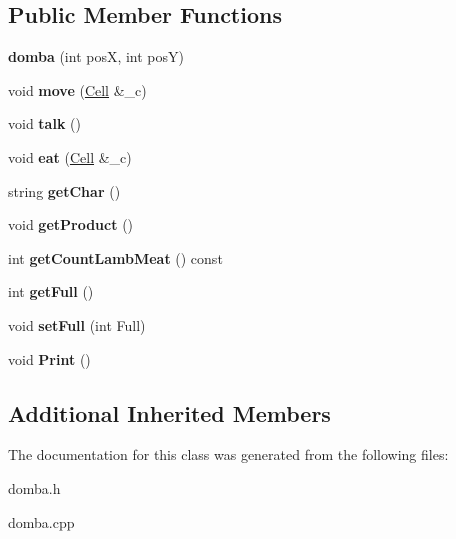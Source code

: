 \subsection*{Public Member Functions}
\begin{DoxyCompactItemize}
\item 
\mbox{\label{classdomba_a2b68f77b04b105d52ce1c3466d13c42a}} 
{\bfseries domba} (int posX, int posY)
\item 
\mbox{\label{classdomba_ab3afd792e6e1dc41d849ad891cf299e3}} 
void {\bfseries move} (\hyperlink{classCell}{Cell} \&\+\_\+c)
\item 
\mbox{\label{classdomba_afbed61a200b204818b134c8c76412d55}} 
void {\bfseries talk} ()
\item 
\mbox{\label{classdomba_abc21d7405a38f4cd880de8a4f6d7b0e5}} 
void {\bfseries eat} (\hyperlink{classCell}{Cell} \&\+\_\+c)
\item 
\mbox{\label{classdomba_ad2cbf646472c3aa5fecd51e0d00d1b3c}} 
string {\bfseries get\+Char} ()
\item 
\mbox{\label{classdomba_af1f02315df4888e95ac53fb29332e226}} 
void {\bfseries get\+Product} ()
\item 
\mbox{\label{classdomba_a60ca47d7f6bc14a539d8530d0cd318be}} 
int {\bfseries get\+Count\+Lamb\+Meat} () const
\item 
\mbox{\label{classdomba_aa54efee014f7803128d384b0b19672a6}} 
int {\bfseries get\+Full} ()
\item 
\mbox{\label{classdomba_a89fb54203e1c9bfb9859344d2903eecf}} 
void {\bfseries set\+Full} (int Full)
\item 
\mbox{\label{classdomba_a2d48bac78090b5b9f059d464ed3b974e}} 
void {\bfseries Print} ()
\end{DoxyCompactItemize}
\subsection*{Additional Inherited Members}


The documentation for this class was generated from the following files\+:\begin{DoxyCompactItemize}
\item 
domba.\+h\item 
domba.\+cpp\end{DoxyCompactItemize}
